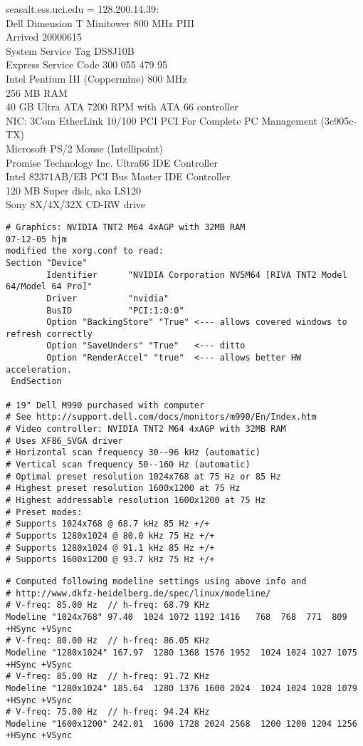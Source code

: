 \documentclass[12pt,twoside]{article}
\begin{document}
seasalt.ess.uci.edu = 128.200.14.39:\\
Dell Dimension T Minitower 800 MHz PIII\\
Arrived 20000615\\
System Service Tag DS8J10B \\
Express Service Code 300 055 479 95 \\
Intel Pentium III (Coppermine) 800 MHz\\
256 MB RAM\\
40 GB Ultra ATA 7200 RPM with ATA 66 controller\\
NIC: 3Com EtherLink 10/100 PCI PCI For Complete PC Management (3c905c-TX)\\
Microsoft PS/2 Mouse (Intellipoint)\\
Promise Technology Inc. Ultra66 IDE Controller\\
Intel 82371AB/EB PCI Bus Master IDE Controller\\
120 MB Super disk, aka LS120\\
Sony 8X/4X/32X CD-RW drive\\
\begin{verbatim}
# Graphics: NVIDIA TNT2 M64 4xAGP with 32MB RAM 
07-12-05 hjm
modified the xorg.conf to read:
Section "Device"
        Identifier      "NVIDIA Corporation NV5M64 [RIVA TNT2 Model 64/Model 64 Pro]"
        Driver          "nvidia"
        BusID           "PCI:1:0:0"
        Option "BackingStore" "True" <--- allows covered windows to refresh correctly
        Option "SaveUnders" "True"   <--- ditto
        Option "RenderAccel" "true"  <--- allows better HW acceleration.
 EndSection

# 19" Dell M990 purchased with computer
# See http://support.dell.com/docs/monitors/m990/En/Index.htm
# Video controller: NVIDIA TNT2 M64 4xAGP with 32MB RAM
# Uses XF86_SVGA driver
# Horizontal scan frequency 30--96 kHz (automatic)
# Vertical scan frequency 50--160 Hz (automatic)
# Optimal preset resolution 1024x768 at 75 Hz or 85 Hz 
# Highest preset resolution 1600x1200 at 75 Hz
# Highest addressable resolution 1600x1200 at 75 Hz
# Preset modes:
# Supports 1024x768 @ 68.7 kHz 85 Hz +/+
# Supports 1280x1024 @ 80.0 kHz 75 Hz +/+
# Supports 1280x1024 @ 91.1 kHz 85 Hz +/+
# Supports 1600x1200 @ 93.7 kHz 75 Hz +/+ 
\end{verbatim}
\begin{verbatim}
# Computed following modeline settings using above info and
# http://www.dkfz-heidelberg.de/spec/linux/modeline/
# V-freq: 85.00 Hz  // h-freq: 68.79 KHz
Modeline "1024x768" 97.40  1024 1072 1192 1416   768  768  771  809 +HSync +VSync
# V-freq: 80.00 Hz  // h-freq: 86.05 KHz
Modeline "1280x1024" 167.97  1280 1368 1576 1952  1024 1024 1027 1075 +HSync +VSync
# V-freq: 85.00 Hz  // h-freq: 91.72 KHz
Modeline "1280x1024" 185.64  1280 1376 1600 2024  1024 1024 1028 1079 +HSync +VSync
# V-freq: 75.00 Hz  // h-freq: 94.24 KHz
Modeline "1600x1200" 242.01  1600 1728 2024 2568  1200 1200 1204 1256 +HSync +VSync 
\end{verbatim}
\end{document}
